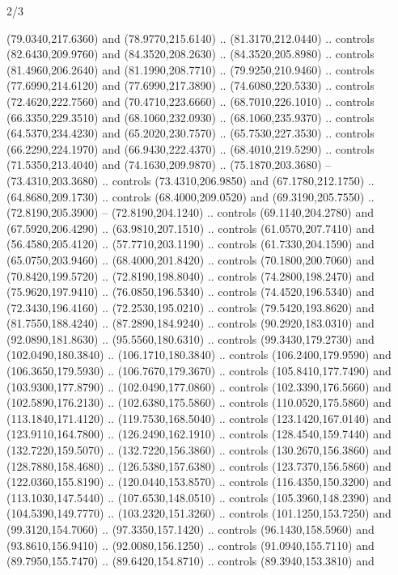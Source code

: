 \begin{flagdescription}{2/3}
\begin{scope}[shift={(0.5\flaglength,0.5)},scale=\flagwidth/480]
\begin{scope}[y=0.8pt, x=0.80pt, yscale=-1,shift={(-450,-300)}]
\begin{scope}[cm={{1.02948,0.0,0.0,1.02948,(-13.26599,6.99414)}}]
\begin{scope}[shift={(341.0917,90.34325)}]
  (79.0340,217.6360) and (78.9770,215.6140) .. (81.3170,212.0440) .. controls
  (82.6430,209.9760) and (84.3520,208.2630) .. (84.3520,205.8980) .. controls
  (81.4960,206.2640) and (81.1990,208.7710) .. (79.9250,210.9460) .. controls
  (77.6990,214.6120) and (77.6990,217.3890) .. (74.6080,220.5330) .. controls
  (72.4620,222.7560) and (70.4710,223.6660) .. (68.7010,226.1010) .. controls
  (66.3350,229.3510) and (68.1060,232.0930) .. (68.1060,235.9370) .. controls
  (64.5370,234.4230) and (65.2020,230.7570) .. (65.7530,227.3530) .. controls
  (66.2290,224.1970) and (66.9430,222.4370) .. (68.4010,219.5290) .. controls
  (71.5350,213.4040) and (74.1630,209.9870) .. (75.1870,203.3680) --
  (73.4310,203.3680) .. controls (73.4310,206.9850) and (67.1780,212.1750) ..
  (64.8680,209.1730) .. controls (68.4000,209.0520) and (69.3190,205.7550) ..
  (72.8190,205.3900) -- (72.8190,204.1240) .. controls (69.1140,204.2780) and
  (67.5920,206.4290) .. (63.9810,207.1510) .. controls (61.0570,207.7410) and
  (56.4580,205.4120) .. (57.7710,203.1190) .. controls (61.7330,204.1590) and
  (65.0750,203.9460) .. (68.4000,201.8420) .. controls (70.1800,200.7060) and
  (70.8420,199.5720) .. (72.8190,198.8040) .. controls (74.2800,198.2470) and
  (75.9620,197.9410) .. (76.0850,196.5340) .. controls (74.4520,196.5340) and
  (72.3430,196.4160) .. (72.2530,195.0210) .. controls (79.5420,193.8620) and
  (81.7550,188.4240) .. (87.2890,184.9240) .. controls (90.2920,183.0310) and
  (92.0890,181.8630) .. (95.5560,180.6310) .. controls (99.3430,179.2730) and
  (102.0490,180.3840) .. (106.1710,180.3840) .. controls (106.2400,179.9590) and
  (106.3650,179.5930) .. (106.7670,179.3670) .. controls (105.8410,177.7490) and
  (103.9300,177.8790) .. (102.0490,177.0860) .. controls (102.3390,176.5660) and
  (102.5890,176.2130) .. (102.6380,175.5860) .. controls (110.0520,175.5860) and
  (113.1840,171.4120) .. (119.7530,168.5040) .. controls (123.1420,167.0140) and
  (123.9110,164.7800) .. (126.2490,162.1910) .. controls (128.4540,159.7440) and
  (132.7220,159.5070) .. (132.7220,156.3860) .. controls (130.2670,156.3860) and
  (128.7880,158.4680) .. (126.5380,157.6380) .. controls (123.7370,156.5860) and
  (122.0360,155.8190) .. (120.0440,153.8570) .. controls (116.4350,150.3200) and
  (113.1030,147.5440) .. (107.6530,148.0510) .. controls (105.3960,148.2390) and
  (104.5390,149.7770) .. (103.2320,151.3260) .. controls (101.1250,153.7250) and
  (99.3120,154.7060) .. (97.3350,157.1420) .. controls (96.1430,158.5960) and
  (93.8610,156.9410) .. (92.0080,156.1250) .. controls (91.0940,155.7110) and
  (89.7950,155.7470) .. (89.6420,154.8710) .. controls (89.3940,153.3810) and

\end{scope}
\end{scope}
\end{scope}
\end{scope}
\end{flagdescription}

